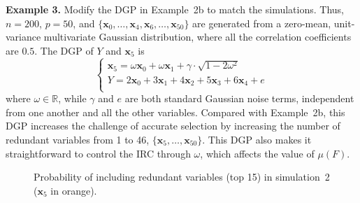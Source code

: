 \documentclass[11pt,review,authoryear]{elsarticle}
\begin{document}
\smallskip
\noindent
\textbf{Example 3.} Modify the DGP in Example~2b to match the \citet{zhaoyu06} simulations. Thus, $n = 200$, $p = 50$, and $\{\mathbf{x}_0, \ldots, \mathbf{x}_4, \mathbf{x}_6, \ldots, \mathbf{x}_{50}\}$ are generated from a zero-mean, unit-variance multivariate Gaussian distribution, where all the correlation coefficients are $0.5$. The DGP of $Y$ and $\mathbf{x}_5$ is
\begin{equation}
	\begin{cases}
    \mathbf{x}_5 = \omega \mathbf{x}_0 + \omega \mathbf{x}_1 + \gamma\cdot \sqrt{1 - 2\omega^2} \\
    Y = 2 \mathbf{x}_0 + 3\mathbf{x}_1 + 4 \mathbf{x}_2 + 5 \mathbf{x}_3 + 6 \mathbf{x}_4 + e \\
	\end{cases}
	\label{eqn:dgp_x5}
\end{equation}
%
where $\omega \in \mathbb{R}$, while $\gamma$ and $e$ are both standard Gaussian noise terms, independent from one another and all the other variables. Compared with Example~2b, this DGP increases the challenge of accurate selection by increasing the number of redundant variables from 1 to 46, $\{\mathbf{x}_5, \ldots, \mathbf{x}_{50}\}$. This DGP also makes it straightforward to control the IRC through $\omega$, which affects the value of $\mu \left( F \right)$.

\begin{figure}
  \centering

  \caption{Probability of including redundant variables (top 15) in simulation~2 ($\mathbf{x}_5$ in orange).}
  \label{fig:solar_ic_type-II}
\end{figure}
\end{document}
